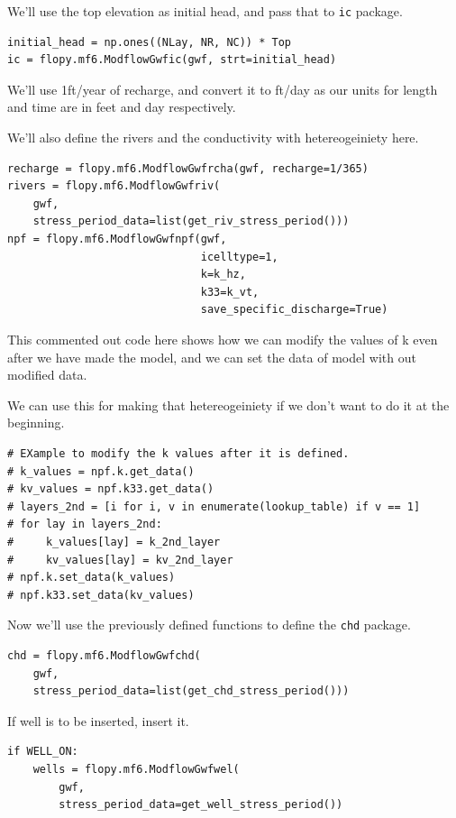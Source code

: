 \documentclass[titlepage,12pt]{unisubmission}
\begin{document}
We'll use the top elevation as initial head, and pass that to \texttt{ic} package.

\begin{verbatim}
initial_head = np.ones((NLay, NR, NC)) * Top
ic = flopy.mf6.ModflowGwfic(gwf, strt=initial_head)
\end{verbatim}

We'll use 1ft/year of recharge, and convert it to ft/day as our units for length and time are in feet and day respectively.

We'll also define the rivers and the conductivity with hetereogeiniety here.

\begin{verbatim}
recharge = flopy.mf6.ModflowGwfrcha(gwf, recharge=1/365)
rivers = flopy.mf6.ModflowGwfriv(
    gwf,
    stress_period_data=list(get_riv_stress_period()))
npf = flopy.mf6.ModflowGwfnpf(gwf,
                              icelltype=1,
                              k=k_hz,
                              k33=k_vt,
                              save_specific_discharge=True)
\end{verbatim}


This commented out code here shows how we can modify the values of k even after we have made the model, and we can set the data of model with out modified data.

We can use this for making that hetereogeiniety if we don't want to do it at the beginning.

\begin{verbatim}
# EXample to modify the k values after it is defined.
# k_values = npf.k.get_data()
# kv_values = npf.k33.get_data()
# layers_2nd = [i for i, v in enumerate(lookup_table) if v == 1]
# for lay in layers_2nd:
#     k_values[lay] = k_2nd_layer
#     kv_values[lay] = kv_2nd_layer
# npf.k.set_data(k_values)
# npf.k33.set_data(kv_values)
\end{verbatim}


Now we'll use the previously defined functions to define the \texttt{chd} package.

\begin{verbatim}
chd = flopy.mf6.ModflowGwfchd(
    gwf,
    stress_period_data=list(get_chd_stress_period()))
\end{verbatim}

If well is to be inserted, insert it.

\begin{verbatim}
if WELL_ON:
    wells = flopy.mf6.ModflowGwfwel(
        gwf,
        stress_period_data=get_well_stress_period())
\end{verbatim}
\end{document}
